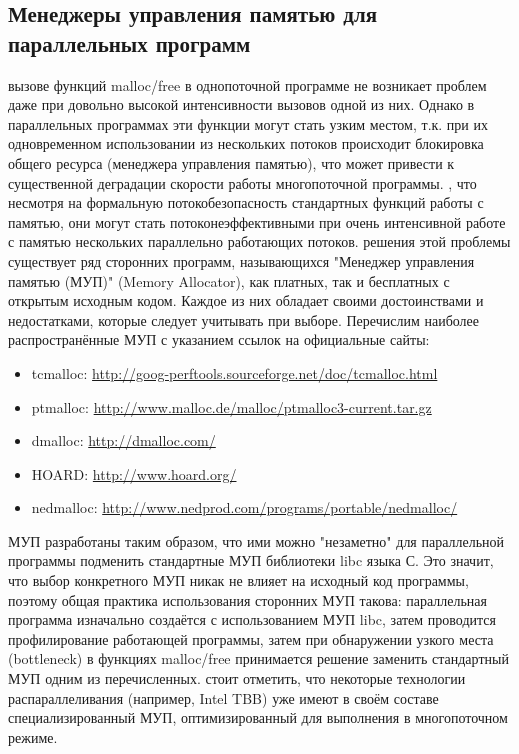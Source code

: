 { %
	\subsection{Менеджеры управления памятью для параллельных программ}
	 вызове функций malloc/free в однопоточной программе не возникает проблем даже при довольно высокой интенсивности вызовов одной из них. Однако в параллельных программах эти функции могут стать узким местом, т.к. при их одновременном использовании из нескольких потоков происходит блокировка общего ресурса (менеджера управления памятью), что может привести к существенной деградации скорости работы многопоточной программы.
	, что несмотря на формальную потокобезопасность стандартных функций работы с памятью, они могут стать потоконеэффективными при очень интенсивной работе с памятью нескольких параллельно работающих потоков.
	 решения этой проблемы существует ряд сторонних программ, называющихся "Менеджер управления памятью (МУП)" (Memory Allocator), как платных, так и бесплатных с открытым исходным кодом. Каждое из них обладает своими достоинствами и недостатками, которые следует учитывать при выборе. Перечислим наиболее распространённые МУП с указанием ссылок на официальные сайты:
	\begin{itemize}
		\sloppy
		\item tcmalloc: \url{http://goog-perftools.sourceforge.net/doc/tcmalloc.html}
		\item ptmalloc: \url{http://www.malloc.de/malloc/ptmalloc3-current.tar.gz}
		\item dmalloc: \url{http://dmalloc.com/}
		\item HOARD: \url{http://www.hoard.org/}
		\item nedmalloc: \url{http://www.nedprod.com/programs/portable/nedmalloc/}
	\end{itemize}
	 МУП разработаны таким образом, что ими можно "незаметно" для параллельной программы подменить стандартные МУП библиотеки libc языка С. Это значит, что выбор конкретного МУП никак не влияет на исходный код программы, поэтому общая практика использования сторонних МУП такова: параллельная программа изначально создаётся с использованием МУП libc, затем проводится профилирование работающей программы, затем при обнаружении узкого места (bottleneck) в функциях malloc/free принимается решение заменить стандартный МУП одним из перечисленных.
	 стоит отметить, что некоторые технологии распараллеливания (например, Intel TBB) уже имеют в своём составе специализированный МУП, оптимизированный для выполнения в многопоточном режиме.
	\par
}